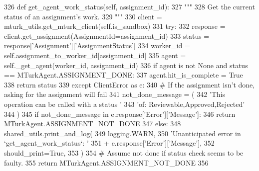 \begin{DoxyCode}
326     \textcolor{keyword}{def }get\_agent\_work\_status(self, assignment\_id):
327         \textcolor{stringliteral}{"""}
328 \textcolor{stringliteral}{        Get the current status of an assignment's work.}
329 \textcolor{stringliteral}{        """}
330         client = mturk\_utils.get\_mturk\_client(self.is\_sandbox)
331         \textcolor{keywordflow}{try}:
332             response = client.get\_assignment(AssignmentId=assignment\_id)
333             status = response[\textcolor{stringliteral}{'Assignment'}][\textcolor{stringliteral}{'AssignmentStatus'}]
334             worker\_id = self.assignment\_to\_worker\_id[assignment\_id]
335             agent = self.\_get\_agent(worker\_id, assignment\_id)
336             \textcolor{keywordflow}{if} agent \textcolor{keywordflow}{is} \textcolor{keywordflow}{not} \textcolor{keywordtype}{None} \textcolor{keywordflow}{and} status == MTurkAgent.ASSIGNMENT\_DONE:
337                 agent.hit\_is\_complete = \textcolor{keyword}{True}
338             \textcolor{keywordflow}{return} status
339         \textcolor{keywordflow}{except} ClientError \textcolor{keyword}{as} e:
340             \textcolor{comment}{# If the assignment isn't done, asking for the assignment will fail}
341             not\_done\_message = (
342                 \textcolor{stringliteral}{'This operation can be called with a status '}
343                 \textcolor{stringliteral}{'of: Reviewable,Approved,Rejected'}
344             )
345             \textcolor{keywordflow}{if} not\_done\_message \textcolor{keywordflow}{in} e.response[\textcolor{stringliteral}{'Error'}][\textcolor{stringliteral}{'Message'}]:
346                 \textcolor{keywordflow}{return} MTurkAgent.ASSIGNMENT\_NOT\_DONE
347             \textcolor{keywordflow}{else}:
348                 shared\_utils.print\_and\_log(
349                     logging.WARN,
350                     \textcolor{stringliteral}{'Unanticipated error in `get\_agent\_work\_status`: '}
351                     + e.response[\textcolor{stringliteral}{'Error'}][\textcolor{stringliteral}{'Message'}],
352                     should\_print=\textcolor{keyword}{True},
353                 )
354                 \textcolor{comment}{# Assume not done if status check seems to be faulty.}
355                 \textcolor{keywordflow}{return} MTurkAgent.ASSIGNMENT\_NOT\_DONE
356 
\end{DoxyCode}
\mbox{\label{classparlai_1_1mturk_1_1core_1_1legacy__2018_1_1worker__manager_1_1WorkerManager_a9847c09d96df8f5b9be39715196f67ba}} 
